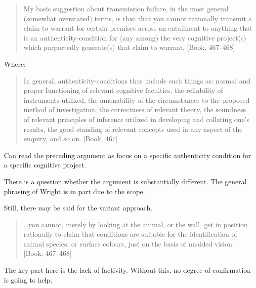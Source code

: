 \documentclass[10pt]{article}
\newcommand{\hozline}[0]{%
  \noindent\hdashrule[0.5ex][c]{\textwidth}{.1pt}{}
}
\begin{document}
\begin{note}
  \begin{quote}
    My basic suggestion about transmission failure, in the most general (somewhat overstated) terms, is this: that you cannot rationally transmit a claim to warrant for certain premises across an entailment to anything that is an authenticity-condition for (any among) the very cognitive project(s) which purportedly generate(s) that claim to warrant.
    [Book, 467--468]
  \end{quote}
Where:
  \begin{quote}
    In general, authenticity-conditions thus include such things as: normal and proper functioning of relevant cognitive faculties, the reliability of instruments utilized, the amenability of the circumstances to the proposed method of investigation, the correctness of relevant theory, the soundness of relevant principles of inference utilized in developing and collating one’s results, the good standing of relevant concepts used in any aspect of the enquiry, and so on.
    [Book, 467]
  \end{quote}

  Can read the preceding argument as focus on a specific authenticity condition for a specific cognitive project.

  There is a question whether the argument is substantially different.
  The general phrasing of Wright is in part due to the scope.

  Still, there may be said for the variant approach.

\begin{quote}
  \dots you cannot, merely by looking at the animal, or the wall, get in position rationally to claim that conditions are suitable for the identiﬁcation of animal species, or surface colours, just on the basis of unaided vision.
    [Book, 467--468]
  \end{quote}
\end{note}

\begin{note}
  The key part here is the lack of factivity.
  Without this, no degree of confirmation is going to help.
\end{note}

\hozline
\end{document}
